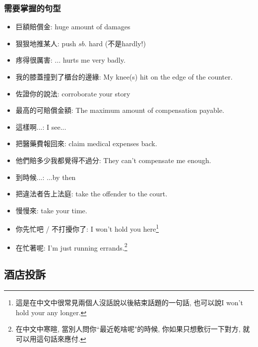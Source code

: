 \subsubsection*{需要掌握的句型}
\begin{multicols}{2}
\begin{itemize}
  \itemsep0em
  \item 巨額賠償金: huge amount of damages
  \item 狠狠地推某人: push $sb.$ hard (不是hardly!)
  \item 疼得很厲害: ... hurts me very badly.
  \item 我的膝蓋撞到了櫃台的邊緣: My knee(s)  hit on the edge of the counter.
  \item 佐證你的說法: corroborate your story
  \item 最高的可賠償金額: The maximum amount of compensation payable.
  \item 這樣啊...: I see...
  \item 把醫藥費報回來: claim medical expenses back.
  \item 他們賠多少我都覺得不過分: They can't compensate me enough.
  \item 到時候...: ...by then
  \item 把違法者告上法庭: take the offender to the court.
  \item 慢慢來: take your time.
  \item 你先忙吧 / 不打擾你了: I won't hold you here\footnote{這是在中文中很常見兩個人沒話說以後結束話題的一句話, 也可以說I won't hold your any longer.}
  \item 在忙著呢: I'm just running errands.\footnote{在中文中寒暄, 當別人問你``最近乾啥呢"的時候, 你如果只想敷衍一下對方, 就可以用這句話來應付.}
\end{itemize}
\end{multicols}

\subsection{酒店投訴}
